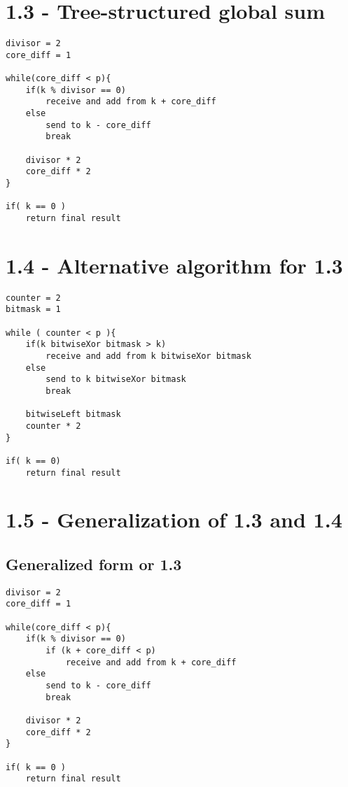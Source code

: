 \documentclass[a4paper,11pt,twoside]{article}
\begin{document}
\section{1.3 - Tree-structured global sum}

\begin{verbatim}
divisor = 2
core_diff = 1

while(core_diff < p){
    if(k % divisor == 0)
        receive and add from k + core_diff
    else 
        send to k - core_diff
        break

    divisor * 2
    core_diff * 2
}

if( k == 0 )
    return final result
\end{verbatim}

\section{1.4 - Alternative algorithm for 1.3}

\begin{verbatim}
counter = 2
bitmask = 1

while ( counter < p ){
    if(k bitwiseXor bitmask > k)
        receive and add from k bitwiseXor bitmask
    else
        send to k bitwiseXor bitmask
        break

    bitwiseLeft bitmask
    counter * 2
}

if( k == 0)
    return final result

\end{verbatim}



\section{1.5 - Generalization of 1.3 and 1.4}

\subsection{Generalized form or 1.3}
\begin{verbatim}
divisor = 2
core_diff = 1

while(core_diff < p){
    if(k % divisor == 0)
        if (k + core_diff < p)  
            receive and add from k + core_diff
    else 
        send to k - core_diff
        break

    divisor * 2
    core_diff * 2
}

if( k == 0 )
    return final result
\end{verbatim}
\end{document}
